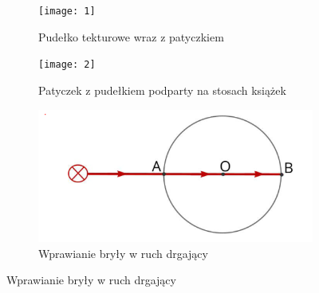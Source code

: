 \documentclass[]{article}
\begin{document}
\begin{figure}[h!]
  \centering
  \begin{subfigure}[b]{0.4\linewidth}
    \texttt{[image: 1]}
    \caption{Pudełko tekturowe wraz z patyczkiem}
  \end{subfigure}
  \begin{subfigure}[b]{0.4\linewidth}
    \texttt{[image: 2]}
    \caption{Patyczek z pudełkiem podparty na stosach książek}
  \end{subfigure}
  \begin{subfigure}[b]{0.5\linewidth}
    \includegraphics[width=\linewidth]{3}
    \caption{Wprawianie bryły w ruch drgający}
  \end{subfigure}
\end{figure}



	
	
	


	

	
\end{document}
